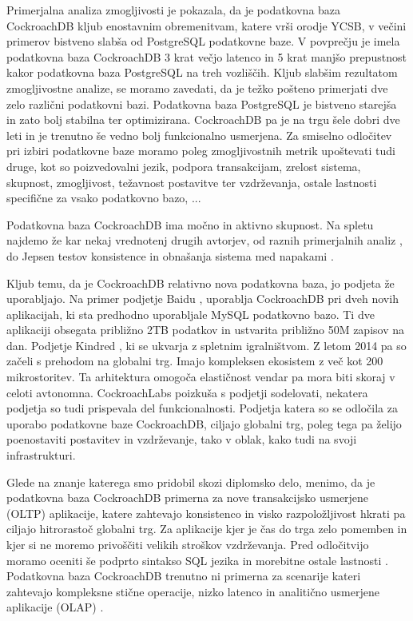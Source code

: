 \documentclass[a4paper, 12pt]{book}
\begin{document}
Primerjalna analiza zmogljivosti je pokazala, da je podatkovna baza Cock\-roachDB kljub enostavnim obremenitvam, katere vrši orodje YCSB, v večini primerov bistveno slabša od PostgreSQL podatkovne baze. V povprečju je imela podatkovna baza Cock\-roachDB 3 krat večjo latenco in 5 krat manjšo prepustnost kakor podatkovna baza PostgreSQL na treh vozliščih.
Kljub slabšim rezultatom zmogljivostne analize, se moramo zavedati, da je težko pošteno primerjati dve zelo različni podatkovni bazi. Podatkovna baza PostgreSQL je bistveno starejša in zato bolj stabilna ter optimizirana. CockroachDB pa je na trgu šele dobri dve leti in je trenutno še vedno bolj funkcionalno usmerjena. Za smiselno odločitev pri izbiri podatkovne baze moramo poleg zmogljivostnih metrik upoštevati tudi druge, kot so poizvedovalni jezik, podpora transakcijam, zrelost sistema, skupnost, zmogljivost, težavnost postavitve ter vzdrževanja, ostale lastnosti specifične za vsako podatkovno bazo, ...

Podatkovna baza CockroachDB ima močno in aktivno skupnost. Na spletu najdemo že kar nekaj vrednotenj drugih avtorjev, od raznih primerjalnih analiz \cite{kaur2017performance, Benchmarking-GCS-CRDB-NuoDB, CRDB-tpcc-vs-aurora, CRDB-2017}, do Jepsen testov konsistence in obnašanja sistema med napakami \cite{CRDB-jepsen, CRDB-jepsen-diy}.

Kljub temu, da je CockroachDB relativno nova podatkovna baza, jo podjeta že uporabljajo. Na primer podjetje Baidu \cite{crdb-baidu}, uporablja CockroachDB pri dveh novih aplikacijah, ki sta predhodno uporabljale MySQL podatkovno bazo. Ti dve aplikaciji obsegata približno 2TB podatkov in ustvarita približno 50M zapisov na dan. Podjetje Kindred \cite{crdb-kindred}, ki se ukvarja z spletnim igralništvom. Z letom 2014 pa so začeli s prehodom na globalni trg. Imajo kompleksen ekosistem z več kot 200 mikrostoritev. Ta arhitektura omogoča elastičnost vendar pa mora biti skoraj v celoti avtonomna. CockroachLabs poizkuša s podjetji sodelovati, nekatera podjetja so tudi prispevala del funkcionalnosti. Podjetja katera so se odločila za uporabo podatkovne baze CockroachDB, ciljajo globalni trg, poleg tega pa želijo poenostaviti postavitev in vzdrževanje, tako v oblak, kako tudi na svoji infrastrukturi.

Glede na znanje katerega smo pridobil skozi diplomsko delo, menimo, da je podatkovna baza CockroachDB primerna za nove transakcijsko usmerjene (OLTP) aplikacije, katere zahtevajo konsistenco in visko razpoložljivost hkrati pa ciljajo hitrorastoč globalni trg. Za aplikacije kjer je čas do trga zelo pomemben in kjer si ne moremo privoščiti velikih stroškov vzdrževanja. Pred odločitvijo moramo oceniti še podprto sintakso SQL jezika \cite{CRDB-sql-features} in morebitne ostale lastnosti \cite{CRDB-limitations}. Podatkovna baza CockroachDB trenutno ni primerna za scenarije kateri zahtevajo kompleksne stične operacije, nizko latenco in analitično usmerjene aplikacije (OLAP) \cite{CRDB-FAQ}.
\end{document}
